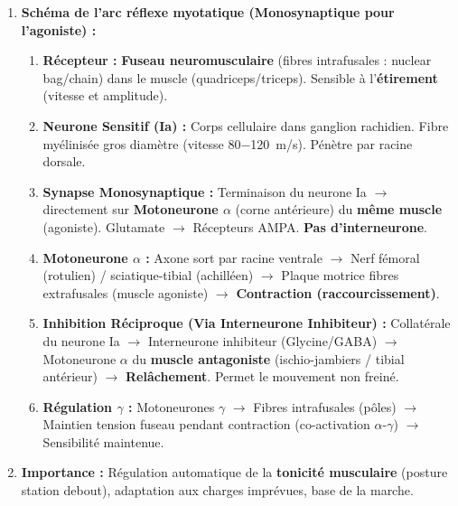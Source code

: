 \documentclass[11pt]{article}
\begin{document}
\begin{methode}
\begin{enumerate}
\begin{itemize}
    \end{itemize}
    \item \textbf{Schéma de l'arc réflexe myotatique (Monosynaptique pour l'agoniste) :}
    \begin{enumerate}
        \item \textbf{Récepteur :} \textbf{Fuseau neuromusculaire} (fibres intrafusales : nuclear bag/chain) dans le muscle (quadriceps/triceps). Sensible à l'\textbf{étirement} (vitesse et amplitude).
        \item \textbf{Neurone Sensitif (Ia) :} Corps cellulaire dans ganglion rachidien. Fibre myélinisée gros diamètre (vitesse \SI{80-120}{m/s}). Pénètre par racine dorsale.
        \item \textbf{Synapse Monosynaptique :} Terminaison du neurone Ia $\rightarrow$ directement sur \textbf{Motoneurone $\alpha$} (corne antérieure) du \textbf{même muscle} (agoniste). Glutamate $\rightarrow$ Récepteurs AMPA. \textbf{Pas d'interneurone}.
        \item \textbf{Motoneurone $\alpha$ :} Axone sort par racine ventrale $\rightarrow$ Nerf fémoral (rotulien) / sciatique-tibial (achilléen) $\rightarrow$ Plaque motrice fibres extrafusales (muscle agoniste) $\rightarrow$ \textbf{Contraction (raccourcissement)}.
        \item \textbf{Inhibition Réciproque (Via Interneurone Inhibiteur) :} Collatérale du neurone Ia $\rightarrow$ Interneurone inhibiteur (Glycine/GABA) $\rightarrow$ Motoneurone $\alpha$ du \textbf{muscle antagoniste} (ischio-jambiers / tibial antérieur) $\rightarrow$ \textbf{Relâchement}. Permet le mouvement non freiné.
        \item \textbf{Régulation $\gamma$ :} Motoneurones $\gamma$ $\rightarrow$ Fibres intrafusales (pôles) $\rightarrow$ Maintien tension fuseau pendant contraction (co-activation $\alpha$-$\gamma$) $\rightarrow$ Sensibilité maintenue.
    \end{enumerate}
    \item \textbf{Importance :} Régulation automatique de la \textbf{tonicité musculaire} (posture station debout), adaptation aux charges imprévues, base de la marche.
\end{enumerate}
\end{methode}
\end{document}
